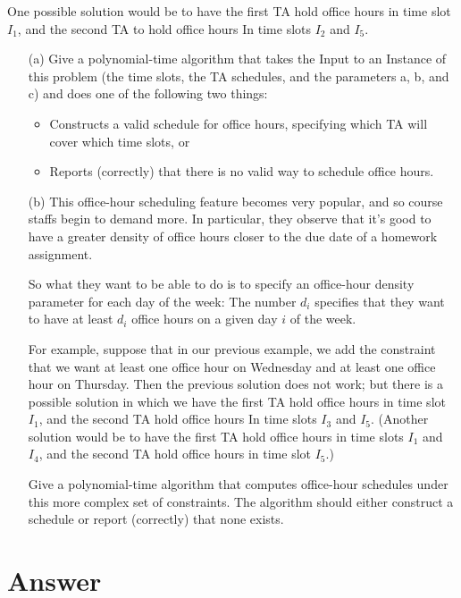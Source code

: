 \documentclass[12pt,letterpaper]{article}
\begin{document}
One possible solution would be to have the first TA hold office hours
in time slot $I_1$, and the second TA to hold office hours In time slots $I_2$
and $I_5$.
\begin{itemize}
\item[(a)] Give a polynomial-time algorithm that takes the Input to an Instance
of this problem (the time slots, the TA schedules, and the parameters
a, b, and c) and does one of the following two things:
\begin{itemize}
\item Constructs a valid schedule for office hours, specifying which
TA will cover which time slots, or
\item Reports (correctly) that there is no valid way to schedule office
hours.
\end{itemize}
\item[(b)] This office-hour scheduling feature becomes very popular, and so
course staffs begin to demand more. In particular, they observe that
it's good to have a greater density of office hours closer to the due
date of a homework assignment.

So what they want to be able to do is to specify an office-hour
density parameter for each day of the week: The number $d_i$ specifies
that they want to have at least $d_i$ office hours on a given day $i$ of the
week.

For example, suppose that in our previous example, we add the
constraint that we want at least one office hour on Wednesday and at
least one office hour on Thursday. Then the previous solution does
not work; but there is a possible solution in which we have the first
TA hold office hours in time slot $I_1$, and the second TA hold office
hours In time slots $I_3$ and $I_5$. (Another solution would be to have the
first TA hold office hours in time slots $I_1$ and $I_4$, and the second TA
hold office hours in time slot $I_5$.)

Give a polynomial-time algorithm that computes office-hour
schedules under this more complex set of constraints. The algorithm
should either construct a schedule or report (correctly) that
none exists.
\end{itemize}

\section*{Answer}
\end{document}
